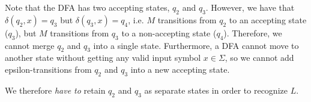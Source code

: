 \begin{problem}
\begin{enumalph}
\begin{Answer}
        \step
        Note that the DFA has two accepting states, $q_2$ and $q_3$.
        However, we have that $\delta(q_2, x) = q_3$ but $\delta(q_3, x) = q_4$,
        i.e. $M$ transitions from $q_2$ to an accepting state ($q_3$),
        but $M$ transitions from $q_3$ to a non-accepting state ($q_4$).
        Therefore, we cannot merge $q_2$ and $q_3$ into a single state.
        Furthermore, a DFA cannot move to another state without getting any
        valid input symbol $x \in \Sigma$, so we cannot add epsilon-transitions
        from $q_2$ and $q_3$ into a new accepting state.

        \step
        We therefore \emph{have to} retain $q_2$ and $q_3$ as separate states
        in order to recognize $L$.
      \end{Answer}
  \end{enumalph}
\end{problem}
